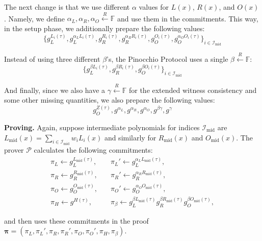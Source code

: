 \documentclass[../lecture-notes.tex]{subfiles}
\begin{document}
The next change is that we use different $\alpha$ values for $L(x)$, $R(x)$, and $O(x)$. Namely, we define $\alpha_L,\alpha_R,\alpha_O \xleftarrow{R} \mathbb{F}$ and use them in the commitments. This way, in the setup phase, we additionally prepare the following values:
\begin{equation*}
    \{g_L^{L_i(\tau)}, g_L^{\alpha_LL_i(\tau)}, g_R^{R_i(\tau)}, g_R^{\alpha_RR_i(\tau)}, g_O^{O_i(\tau)}, g_O^{\alpha_O O_i(\tau)}\}_{i \in \mathcal{I}_{\text{mid}}}
\end{equation*}

Instead of using three different $\beta$'s, the Pinocchio Protocol uses a single $\beta \xleftarrow{R} \mathbb{F}$:
\begin{equation*}
    \{g_L^{\beta L_i(\tau)}, g_R^{\beta R_i(\tau)},g_O^{\beta O_i(\tau)} \}_{i \in \mathcal{I}_{\text{mid}}}
\end{equation*}

And finally, since we also have a $\gamma \xleftarrow{R} \mathbb{F}$ for the extended witness consistency and some other missing quantities, we also prepare the following values:
\begin{equation*}
    g_O^{Z(\tau)}, g^{\alpha_L}, g^{\alpha_R}, g^{\alpha_O},g^{\beta\gamma}, g^{\gamma}
\end{equation*}

\textcolor{green!50!black}{\textbf{Proving.}} Again, suppose intermediate polynomials for indices $\mathcal{I}_{\text{mid}}$ are $L_{\text{mid}}(x) = \sum_{i \in \mathcal{I}_{\text{mid}}}w_iL_i(x)$ and similarly for $R_{\text{mid}}(x)$ and $O_{\text{mid}}(x)$. The prover $\mathcal{P}$ calculates the following commitments:
\begin{align*}
    \pi_L \gets g_L^{L_{\text{mid}}(\tau)}, & \quad \pi_L' \gets g_L^{\alpha_LL_{\text{mid}}(\tau)}, \\
    \pi_R \gets g_R^{R_{\text{mid}}(\tau)}, & \quad \pi_R' \gets g_R^{\alpha_RR_{\text{mid}}(\tau)}, \\
    \pi_O \gets g_O^{O_{\text{mid}}(\tau)}, & \quad \pi_O' \gets g_O^{\alpha_OO_{\text{mid}}(\tau)}, \\
    \pi_H \gets g^{H(\tau)}, & \quad \pi_{\beta} \gets g_L^{\beta L_{\text{mid}}(\tau)}g_R^{\beta R_{\text{mid}}(\tau)}g_O^{\beta O_{\text{mid}}(\tau)},
\end{align*}

and then uses these commitments in the proof $\boldsymbol{\pi} = (\pi_L,\pi_L',\pi_R,\pi_R',\pi_O,\pi_O',\pi_H,\pi_{\beta})$.
\end{document}
